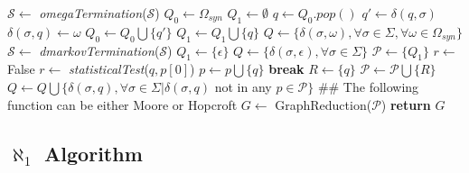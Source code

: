 {\begin{algorithm}
  \caption{$\aleph$($\mathcal{S}, \Omega_{syn}$)\label{alg:aleph}}
    \begin{algorithmic}[1]
      \Procedure{}{}
      		\State $\mathcal{S} \gets$ \textit{omegaTermination}($\mathcal{S}$)
	      	\State $Q_0 \gets \Omega_{syn}$
	      	\State $Q_1 \gets \emptyset$
	      		\State $q \gets Q_0.pop()$
	      		\For{$\sigma \in \Sigma$}
	      			\State $q' \gets \delta(q,\sigma)$
	      				\State $\delta(\sigma,q) \gets \omega$
	      			\Else
	      					\State $Q_0 \gets Q_0\bigcup\{q'\}$
	      				\EndIf 
	      			\EndIf
	      			\State $Q_1 \gets Q_1\bigcup\{q\}$
	      		\EndFor
	      	\EndWhile	      	
      		\State $Q \gets \{\delta(\sigma,\omega), \forall \sigma \in \Sigma, \forall \omega \in \Omega_{syn}\}$
      	\Else
      		\State $\mathcal{S} \gets$ \textit{dmarkovTermination}($\mathcal{S}$)
      		\State $Q_1 \gets \{\epsilon\}$
      		\State $Q \gets \{\delta(\sigma,\epsilon), \forall \sigma \in \Sigma\}$
      	\EndIf
      	\State $\mathcal{P} \gets \{Q_1\}$
      		\State $r \gets$ False
      			\State $r \gets$ \textit{statisticalTest}($q, p[0]$)
      				\State $p \gets p\bigcup\{q\}$
      				\State \textbf{break}
      			\EndIf
      		\EndFor
      			\State $R \gets \{q\}$
      			\State $\mathcal{P} \gets \mathcal{P}\bigcup\{R\}$
      		\EndIf 
      		\State $Q \gets Q\bigcup\{\delta(\sigma,q),\forall \sigma\in\Sigma|\delta(\sigma,q)$ not in any $p\in\mathcal{P}\}$
      	\EndFor
      	\State \#\# The following function can be either Moore or Hopcroft
      	\State $G \gets$ GraphReduction($\mathcal{P}$)
      	\State \textbf{return} $G$
      \EndProcedure
    \end{algorithmic}
  \end{algorithm}


\subsection{$\aleph_1$ Algorithm}

}
